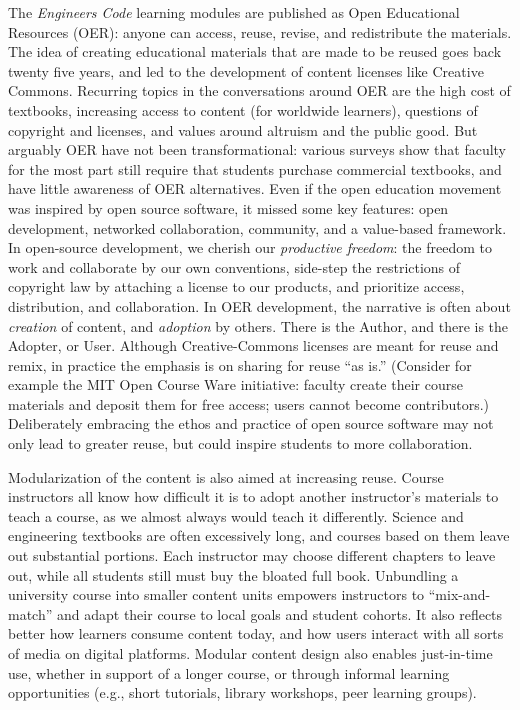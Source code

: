 \documentclass[10pt,journal,compsoc]{IEEEtran}
\begin{document}
The \emph{Engineers Code} learning modules are published as Open Educational Resources (OER): anyone can access, reuse, revise, and redistribute the materials. 
The idea of creating educational materials that are made to be reused goes back twenty five years, and led to the development of content licenses like Creative Commons. 
Recurring topics in the conversations around OER are the high cost of textbooks, increasing access to content (for worldwide learners), questions of copyright and licenses, and values around altruism and the public good. 
But arguably OER have not been transformational: various surveys show that faculty for the most part still require that students purchase commercial textbooks, and have little awareness of OER alternatives. 
Even if the open education movement was inspired by open source software, it missed some key features: open development, networked collaboration, community, and a value-based framework. 
In open-source development, we cherish our \emph{productive freedom}: the freedom to work and collaborate by our own conventions, side-step the restrictions of copyright law by attaching a license to our products, and prioritize access, distribution, and collaboration. 
In OER development, the narrative is often about \emph{creation} of content, and \emph{adoption} by others. There is the Author, and there is the Adopter, or User. 
Although Creative-Commons licenses are meant for reuse and remix, in practice the emphasis is on sharing for reuse ``as is.'' 
(Consider for example the MIT Open Course Ware initiative: faculty create their course materials and deposit them for free access; users cannot become contributors.) 
Deliberately embracing the ethos and practice of open source software may not only lead to greater reuse, but could inspire students to more collaboration.

Modularization of the content is also aimed at increasing reuse. 
Course instructors all know how difficult it is to adopt another instructor's materials to teach a course, as we almost always would teach it differently. 
Science and engineering textbooks are often excessively long, and courses based on them leave out substantial portions. 
Each instructor may choose different chapters to leave out, while all students still must buy the bloated full book. 
Unbundling a university course into smaller content units empowers instructors to ``mix-and-match'' and adapt their course to local goals and student cohorts. 
It also reflects better how learners consume content today, and how users interact with all sorts of media on digital platforms. 
Modular content design also enables just-in-time use, whether in support of a longer course, or through informal learning opportunities (e.g., short tutorials, library workshops, peer learning groups). 
\end{document}
